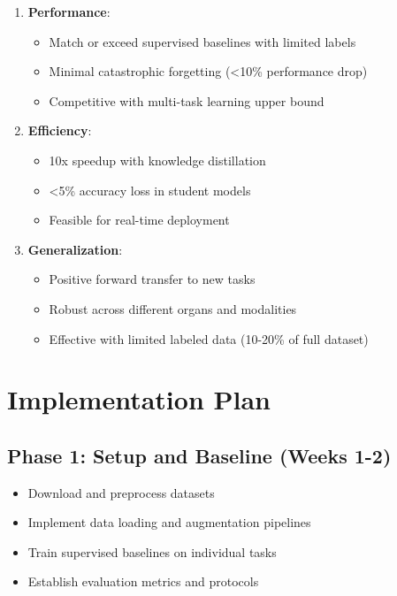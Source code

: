 \documentclass[conference]{IEEEtran}
\begin{document}
\begin{enumerate}
    \item \textbf{Performance}:
    \begin{itemize}
        \item Match or exceed supervised baselines with limited labels
        \item Minimal catastrophic forgetting (<10\% performance drop)
        \item Competitive with multi-task learning upper bound
    \end{itemize}
    
    \item \textbf{Efficiency}:
    \begin{itemize}
        \item 10x speedup with knowledge distillation
        \item <5\% accuracy loss in student models
        \item Feasible for real-time deployment
    \end{itemize}
    
    \item \textbf{Generalization}:
    \begin{itemize}
        \item Positive forward transfer to new tasks
        \item Robust across different organs and modalities
        \item Effective with limited labeled data (10-20\% of full dataset)
    \end{itemize}
\end{enumerate}

\section{Implementation Plan}

\subsection{Phase 1: Setup and Baseline (Weeks 1-2)}

\begin{itemize}
    \item Download and preprocess datasets
    \item Implement data loading and augmentation pipelines
    \item Train supervised baselines on individual tasks
    \item Establish evaluation metrics and protocols
\end{itemize}
\end{document}
